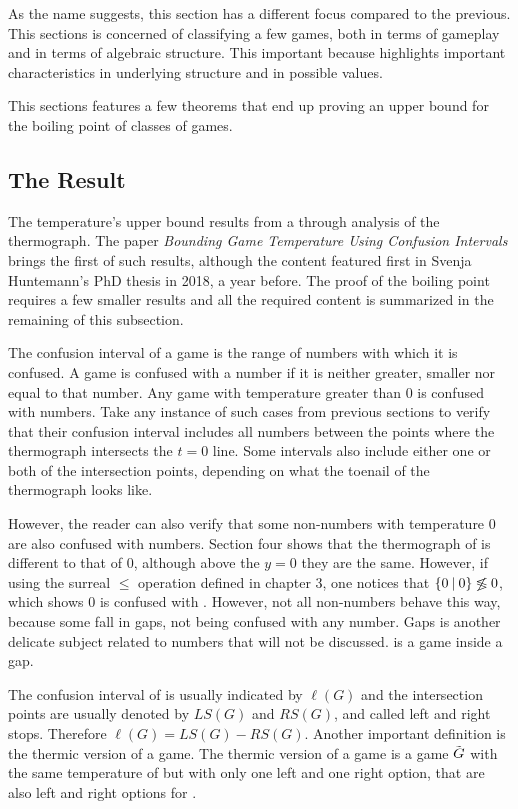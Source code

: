 As the name suggests, this section has a different focus compared to the previous. This sections is concerned of classifying a few games, both in terms of gameplay and in terms of algebraic structure. This important because highlights important characteristics in underlying structure and in possible values.

This sections features a few theorems that end up proving an upper bound for the boiling point of classes of games.

\subsection*{The Result}

The temperature's upper bound results from a through analysis of the thermograph. The paper \textit{Bounding Game Temperature Using Confusion
Intervals} \cite{12} brings the first of such results, although the content featured first in Svenja Huntemann's PhD thesis \cite{5} in 2018, a year before. The proof of the boiling point requires a few smaller results and all the required content is summarized in the remaining of this subsection.

The confusion interval of a game is the range of numbers with which it is confused. A game is confused with a number if it is neither greater, smaller nor equal to that number. Any game with temperature greater than 0 is confused with numbers. Take any instance of such cases from previous sections to verify that their confusion interval includes all numbers between the points where the thermograph intersects the $t=0$ line. Some intervals also include either one or both of the intersection points, depending on what the toenail of the thermograph looks like.

However, the reader can also verify that some non-numbers with temperature 0 are also confused with numbers. Section four shows that the thermograph of  is different to that of 0, although above the $y=0$ they are the same. However, if using the surreal $\leq$ operation defined in chapter 3, one notices that $\mbox{$\{0\:|\:0\}$} \not\lessgtr 0$, which shows $0$ is confused with . However, not all non-numbers behave this way, because some fall in gaps, not being confused with any number. Gaps is another delicate subject related to numbers that will not be discussed.  is a game inside a gap.

The confusion interval of \Gm{} is usually indicated by $\ell(G)$ and the intersection points are usually denoted by $LS(G)$ and $RS(G)$, and called left and right stops. Therefore $\ell(G) = LS(G)-RS(G)$. Another important definition is the thermic version of a game. The thermic version of a game \Gm{} is a game $\tilde{\mbox{$G$}}$ with the same temperature of \Gm{} but with only one left and one right option, that are also left and right options for \Gm{}.


